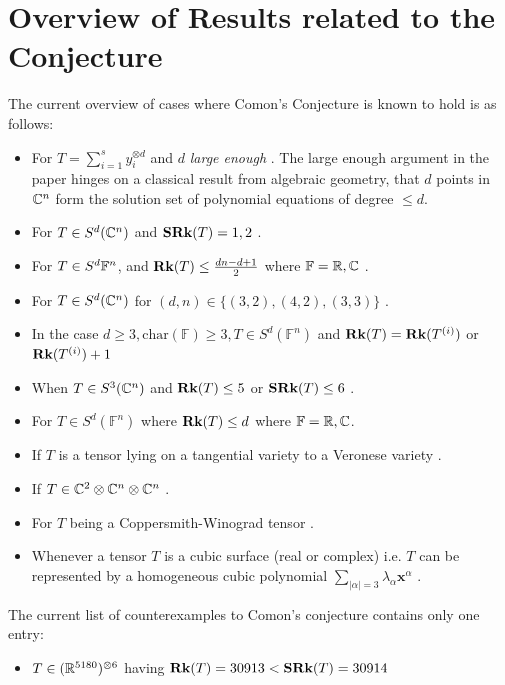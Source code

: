 \documentclass[../Lael_John_MasterThesis_Draft.tex]{subfiles}
\begin{document}
\section{Overview of Results related to the Conjecture}\label{section:validoverview}
The current overview of cases where Comon's Conjecture is known to hold is as follows: \begin{itemize}
	\item For $T = \sum_{i=1}^{s} y_i^{\otimes d}$ and $d$ \textit{large enough} \cite{comon_symmetric_2008}. The large enough argument in the paper hinges on a classical result from algebraic geometry, that $d$ points in $\mathbb{C}^n$ form the solution set of polynomial equations of degree $\leq d$.
	\item For $T \in S^d(\mathbb{C}^n)$ and $\textbf{SRk}(T) = 1, 2$ \cite{comon_symmetric_2008}.
	\item For $T \in S^d{\mathbb{F}^n}$, and $\textbf{Rk}(T) \leq \frac{dn - d + 1}{2}$ where $\mathbb{F} = \mathbb{R}, \mathbb{C}$ \cite{oeding_report_2008}.
	\item For $T \in S^d(\mathbb{C}^n)$ for $(d,n) \in \{(3,2), (4,2), (3,3)\}$ \cite{friedland_remarks_2016}.
	\item In the case $d \geq 3,  \text{char}(\mathbb{F})  \geq 3, T \in S^d(\mathbb{F}^n)$ and $\textbf{Rk}(T) = \textbf{Rk}(T^{(i)})$ or $\textbf{Rk}(T^{(i)}) + 1$ \cite{friedland_remarks_2016}
	\item When $T \in S^3(\mathbb{C}^n)$ and $\textbf{Rk}(T) \leq 5$ or $\textbf{SRk}(T) \leq 6$ \cite{friedland_remarks_2016}.
	\item For $T \in S^d(\mathbb{F}^n)$ where $\textbf{Rk}(T) \leq d$ where $\mathbb{F} = \mathbb{R} , \mathbb{C}$\cite{zhang_comons_2016}.
	\item If $T$ is a tensor lying on a tangential variety to a Veronese variety \cite{ballico_tensor_2013}.
	\item If $T \in \mathbb{C}^2 \otimes \mathbb{C}^n \otimes \mathbb{C}^n$ \cite{buczynski_ranks_2013}.
	\item For $T$ being a Coppersmith-Winograd tensor \cite{landsberg_abelian_2017}.
	\item Whenever a tensor $T$ is a cubic surface (real or complex) i.e. $T$ can be represented by a homogeneous cubic polynomial $ \sum_{|\alpha|=3} \lambda_{\alpha}\mathbf{x}^{\alpha}$ \cite{seigal_ranks_2020}.
\end{itemize}
The current list of counterexamples to Comon's conjecture contains only one entry: \begin{itemize}
	\item $T \in (\mathbb{R}^{5180})^{\otimes 6}$ having $\textbf{Rk}(T) = 30913 < \textbf{SRk}(T) = 30914$ \cite{wang_lower_2023}
\end{itemize}
\end{document}
